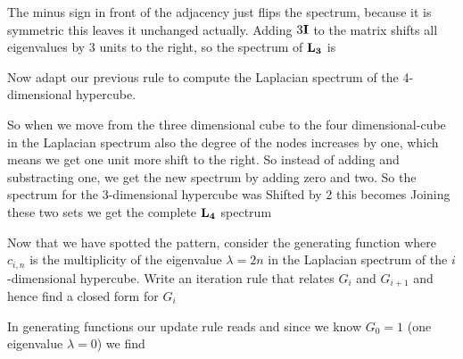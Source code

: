 \solution
The minus sign in front of the adjacency just flips the spectrum, because it is symmetric this leaves it unchanged actually. Adding $3{\bf I}$ to the matrix shifts all eigenvalues by 3 units to the right, so the spectrum of ${\bf L_3}$ is

\subquestion
Now adapt our previous rule to compute the Laplacian spectrum of the 4-dimensional hypercube.

\solution
So when we move from the three dimensional cube to the four dimensional-cube in the Laplacian spectrum also the degree of the nodes increases by one, which means we get one unit more shift to the right. So instead of adding and substracting one, we get the new spectrum by adding zero and two. So the spectrum for the 3-dimensional hypercube was
Shifted by 2 this becomes 
Joining these two sets we get the complete ${\bf L_4}$ spectrum

\subquestion
Now that we have spotted the pattern, consider the generating function
where $c_{i,n}$ is the multiplicity of the eigenvalue $\lambda=2n$ in the Laplacian spectrum of the $i$-dimensional hypercube. Write an iteration rule 
that relates $G_i$ and $G_{i+1}$ and hence find a closed form for $G_i$

\solution
In generating functions our update rule reads 
and since we know $G_0=1$ (one eigenvalue $\lambda=0$) we find
